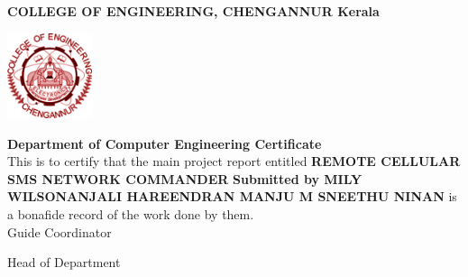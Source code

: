 \begin{center}


{\large\textbf{COLLEGE OF ENGINEERING, CHENGANNUR \linebreak Kerala}\vspace{1cm}} \\ \bigskip %


\includegraphics[height=2.5cm,width=2.5cm]{emblem1} \\ \medskip %

\begingroup
{\large\textbf{Department of Computer Engineering\vspace{1cm} \linebreak Certificate}} \\ \bigskip
{{\large {This is to certify that the main project report entitled}}\vspace{1cm}\linebreak}
{{\large \textbf{REMOTE CELLULAR SMS NETWORK COMMANDER \vspace{1cm} \linebreak}}}
{{\normalsize \textbf{Submitted by \linebreak MILY WILSON\linebreak ANJALI HAREENDRAN \linebreak MANJU M S\linebreak NEETHU NINAN}}\vspace{.5cm}\linebreak}
{{\large is a bonafide record of the work done by them.}\vspace{2cm}}\\ \bigskip
{{\normalsize Guide \hspace{10cm}Coordinator\vspace{2cm}}}\\ \bigskip
\begin{center}
{{\normalsize Head of Department }}
\end{center}
\endgroup

\end{center}
